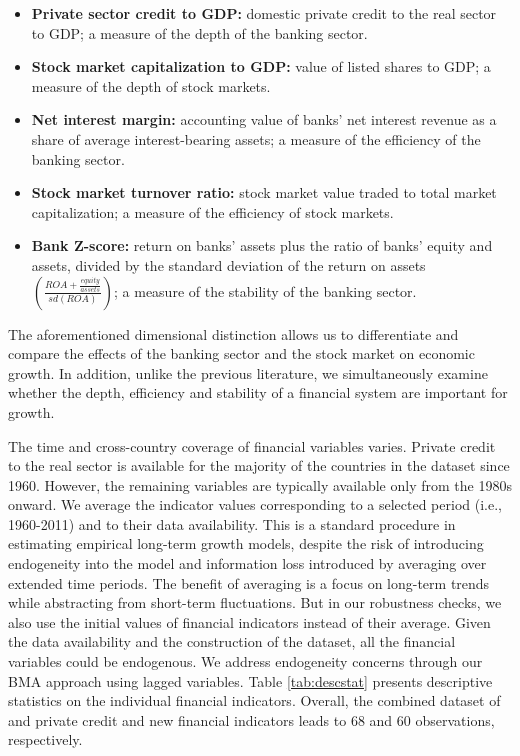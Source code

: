 \begin{refsection}
\begin{itemize}
	\item \textbf{Private sector credit to GDP:} domestic private credit to the real sector to GDP; a measure of the depth of the banking sector.
	\item \textbf{Stock market capitalization to GDP:} value of listed shares to GDP; a measure of the depth of stock markets.
	\item \textbf{Net interest margin:} accounting value of banks' net interest revenue as a share of average interest-bearing assets; a measure of the efficiency of the banking sector.
	\item \textbf{Stock market turnover ratio:} stock market value traded to total market capitalization; a measure of the efficiency of stock markets.
	\item \textbf{Bank Z-score:} return on banks' assets plus the ratio of banks' equity and assets, divided by the standard deviation of the return on assets $\left(\frac{ROA + \frac{equity}{assets}}{sd(ROA)}\right)$; a measure of the stability of the banking sector.
\end{itemize} 
%
The aforementioned dimensional distinction allows us to differentiate and compare the effects of the banking sector and the stock market on economic growth. In addition, unlike the previous literature, we simultaneously examine whether the depth, efficiency and stability of a financial system are important for growth. 

The time and cross-country coverage of financial variables varies. Private credit to the real sector is available for the majority of the countries in the dataset since 1960. However, the remaining variables are typically available only from the 1980s onward. We average the indicator values corresponding to a selected period (i.e., 1960-2011) and to their data availability. This is a standard procedure in estimating empirical long-term growth models, despite the risk of introducing endogeneity into the model and information loss introduced by averaging over extended time periods. The benefit of averaging is a focus on long-term trends while abstracting from short-term fluctuations. But in our robustness checks, we also use the initial values of financial indicators instead of their average. Given the data availability and the construction of the dataset, all the financial variables could be endogenous. We address endogeneity concerns through our \ac{BMA} approach using lagged variables. Table \ref{tab:descstat} presents descriptive statistics on the individual financial indicators. Overall, the combined dataset of \textcite{Fernandezetal2001} and private credit and new financial indicators leads to 68 and 60 observations, respectively.


\end{refsection}
